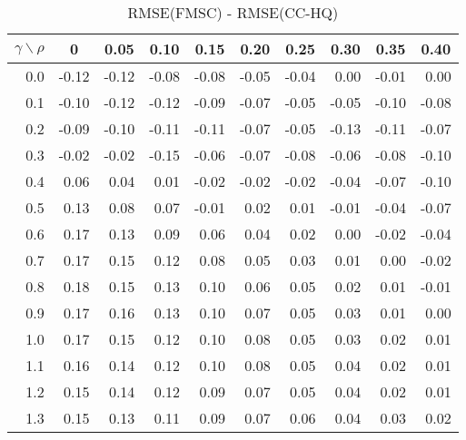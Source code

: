 \documentclass[12pt]{article}
\begin{document}
\begin{table}[!tbp]
\caption{RMSE(FMSC) - RMSE(CC-HQ)}
 \begin{center}
 \begin{tabular}{r|rrrrrrrrr}\hline\hline
\multicolumn{1}{c|}{$\gamma\backslash\rho$}&\multicolumn{1}{c}{0}&\multicolumn{1}{c}{0.05}&\multicolumn{1}{c}{0.10}&\multicolumn{1}{c}{0.15}&\multicolumn{1}{c}{0.20}&\multicolumn{1}{c}{0.25}&\multicolumn{1}{c}{0.30}&\multicolumn{1}{c}{0.35}&\multicolumn{1}{c}{0.40}\tabularnewline
\hline

0.0&-0.12&-0.12&-0.08&-0.08&-0.05&-0.04& 0.00&-0.01& 0.00\tabularnewline
0.1&-0.10&-0.12&-0.12&-0.09&-0.07&-0.05&-0.05&-0.10&-0.08\tabularnewline
0.2&-0.09&-0.10&-0.11&-0.11&-0.07&-0.05&-0.13&-0.11&-0.07\tabularnewline
0.3&-0.02&-0.02&-0.15&-0.06&-0.07&-0.08&-0.06&-0.08&-0.10\tabularnewline
0.4& 0.06& 0.04& 0.01&-0.02&-0.02&-0.02&-0.04&-0.07&-0.10\tabularnewline
0.5& 0.13& 0.08& 0.07&-0.01& 0.02& 0.01&-0.01&-0.04&-0.07\tabularnewline
0.6& 0.17& 0.13& 0.09& 0.06& 0.04& 0.02& 0.00&-0.02&-0.04\tabularnewline
0.7& 0.17& 0.15& 0.12& 0.08& 0.05& 0.03& 0.01& 0.00&-0.02\tabularnewline
0.8& 0.18& 0.15& 0.13& 0.10& 0.06& 0.05& 0.02& 0.01&-0.01\tabularnewline
0.9& 0.17& 0.16& 0.13& 0.10& 0.07& 0.05& 0.03& 0.01& 0.00\tabularnewline
1.0& 0.17& 0.15& 0.12& 0.10& 0.08& 0.05& 0.03& 0.02& 0.01\tabularnewline
1.1& 0.16& 0.14& 0.12& 0.10& 0.08& 0.05& 0.04& 0.02& 0.01\tabularnewline
1.2& 0.15& 0.14& 0.12& 0.09& 0.07& 0.05& 0.04& 0.02& 0.01\tabularnewline
1.3& 0.15& 0.13& 0.11& 0.09& 0.07& 0.06& 0.04& 0.03& 0.02\tabularnewline
\hline
\end{tabular}

\end{center}

\end{table}

%
\end{document}

